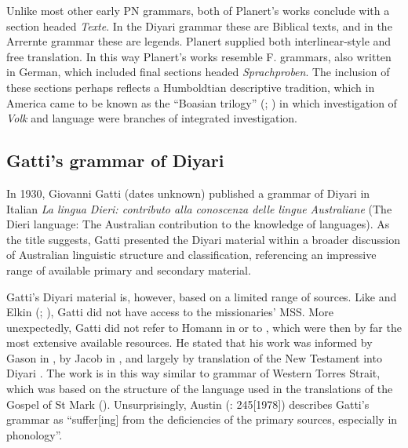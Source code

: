 Unlike most other early PN grammars, both of Planert’s works conclude with a section headed \textit{Texte}. In the Diyari grammar these are Biblical texts, and in the Arrernte grammar these are legends. Planert supplied both interlinear-style and free translation. In this way Planert’s works resemble F.  grammars, also written in German, which included final sections headed \textit{Sprachproben}. The inclusion of these sections perhaps reflects a Humboldtian descriptive tradition, which in America came to be known as the “Boasian trilogy” (\citealt[8--9]{darnell_indo-european_1999}; ) in which investigation of \textit{Volk} and language were branches of integrated investigation.

\subsection{Gatti’s grammar of Diyari \citeyearpar{gatti_lingua_1930}}
\label{sec:key:8.4.4}\label{bkm:Ref73350344}\label{bkm:Ref516424775}\label{bkm:Ref335988141}
In 1930, Giovanni Gatti (dates unknown) published a grammar of Diyari in Italian \textit{La lingua Dieri: contributo alla conoscenza delle lingue Australiane} (The Dieri language: The Australian contribution to the knowledge of languages). As the title suggests, Gatti presented the Diyari material within a broader discussion of Australian linguistic structure and classification, referencing an impressive range of available primary and secondary material.

Gatti’s Diyari material is, however, based on a limited range of sources. Like \citet[2]{ray_aboriginal_1925} and Elkin (\citeyear[9]{elkin_nature_1937}; ), Gatti did not have access to the missionaries' MSS. More unexpectedly, Gatti did not refer to Homann in \citet{fraser_australian_1892} or to \citet{planert_australische_1908}, which were then by far the most extensive available resources. He stated that his work was informed by Gason in \citet{curr_australian_1886}, by Jacob in \citet{curr_australian_1886}, and largely by  translation of the New Testament into Diyari \citep[47]{gatti_lingua_1930}. The work is in this way similar to  grammar of Western Torres Strait, which was based on the structure of the language used in the translations of the Gospel of St Mark (). Unsurprisingly, Austin (\citeyear{austin_grammar_2013}: 245[1978]) describes Gatti’s grammar as “suffer[ing] from the deficiencies of the primary sources, especially in phonology”.

